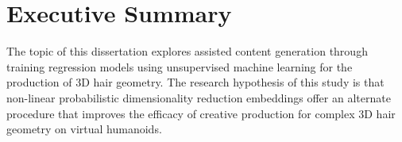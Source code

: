 \documentclass[ %
author={Dillon Keith Diep},
supervisor={Dr. Carl Henrik Ek},
degree={MEng},
title={ART-CG:},
subtitle={Assisted Real-time Content Generation of 3D Hair by Learning Manifolds},
type={Research},
year={2017} ]{dissertation}
\begin{document}




\maketitle


\frontmatter


\makedecl


\tableofcontents
\listoffigures
\listoftables
\listofalgorithms
\lstlistoflistings



\chapter*{Executive Summary}
The topic of this dissertation explores assisted content generation through training regression models using unsupervised machine learning for the production of 3D hair geometry. The research hypothesis of this study is that non-linear probabilistic dimensionality reduction embeddings offer an alternate procedure that improves the efficacy of creative production for complex 3D hair geometry on virtual humanoids.
\end{document}
